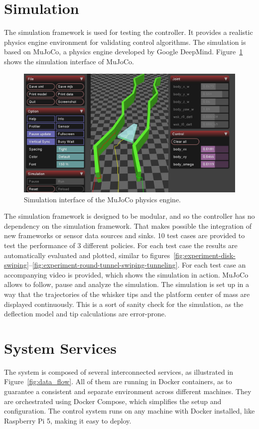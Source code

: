 \section{Simulation}
The simulation framework is used for testing the controller.
It provides a realistic physics engine environment for validating control algorithms.
The simulation is based on MuJoCo, a physics engine developed by Google DeepMind.
Figure~\cref{fig:mujoco} shows the simulation interface of MuJoCo.

\begin{figure}
    \centering
    \includegraphics[width=\textwidth]{figures/mujoco}
    \caption{Simulation interface of the MuJoCo physics engine.}
    \label{fig:mujoco}
\end{figure}

The simulation framework is designed to be modular, and so the controller has no dependency on the simulation framework.
That makes possible the integration of new frameworks or sensor data sources and sinks.
10 test cases are provided to test the performance of 3 different policies.
For each test case the results are automatically evaluated and plotted, similar to figures~\ref{fig:experiment-disk-swiping}--\ref{fig:experiment-round-tunnel-swiping-tunneling}.
For each test case an accompanying video is provided, which shows the simulation in action.
MuJoCo allows to follow, pause and analyze the simulation.
The simulation is set up in a way that the trajectories of the whisker tips and the platform center of mass are displayed continuously.
This is a sort of sanity check for the simulation, as the deflection model and tip calculations are error-prone.


\section{System Services}
The system is composed of several interconnected services, as illustrated in Figure~\ref{fig:data_flow}.
All of them are running in Docker containers, as to guarantee a consistent and separate environment across different machines.
They are orchestrated using Docker Compose, which simplifies the setup and configuration.
The control system runs on any machine with Docker installed, like Raspberry Pi 5, making it easy to deploy.

